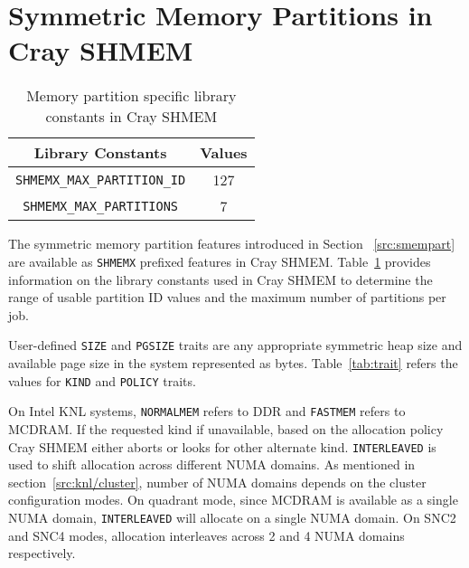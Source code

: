 \section{Symmetric Memory Partitions in Cray SHMEM}
\label{src:implement}
\begin{table}[ht!]
\vspace{-20pt}
\centering
\begin{tabular}{|c c|}\hline
    Library Constants & Values \\[0.5ex]
    \hline\hline
    \texttt{SHMEMX\_MAX\_PARTITION\_ID} & 127 \\
    \texttt{SHMEMX\_MAX\_PARTITIONS} & 7 \\
    \hline
\end{tabular}
\caption{Memory partition specific library constants in Cray SHMEM}
\label{tab:const}
\end{table}
\vspace{-20pt}

The symmetric memory partition features introduced in Section
~\ref{src:smempart} are available as \texttt{SHMEMX} prefixed
features in Cray SHMEM. Table~\ref{tab:const} provides information
on the library constants used in Cray SHMEM to determine the
range of usable partition ID values and the maximum number of
partitions per job.

User-defined \texttt{SIZE} and \texttt{PGSIZE} traits are any appropriate
symmetric heap size
and available page size in the system represented as bytes.
Table~\ref{tab:trait} refers the values for \texttt{KIND} and
\texttt{POLICY} traits. %

On Intel KNL systems, \texttt{NORMALMEM} refers to DDR and
\texttt{FASTMEM} refers to
MCDRAM. If the requested kind if unavailable,
based on the allocation policy Cray SHMEM either aborts or looks for
other alternate kind. \texttt{INTERLEAVED} is used to shift
allocation
across
different NUMA domains. As mentioned in section~\ref{src:knl/cluster},
number of NUMA domains depends on the cluster configuration modes.
On quadrant mode, since MCDRAM is
available as a
single NUMA domain, \texttt{INTERLEAVED} will allocate on a single
NUMA domain.
On SNC2 and SNC4 modes, allocation interleaves across 2 and 4 NUMA
domains
respectively.

